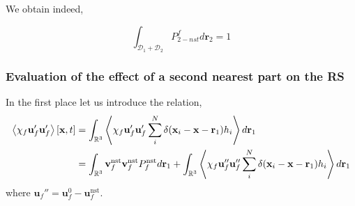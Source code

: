 We obtain indeed, 

\begin{equation}
    \int_{
        \mathcal{D}_1 + \mathcal{D}_2
    }
    P_{2-nst}^f
    d\textbf{r}_2 
    = 
    1
\end{equation}


\subsubsection{Evaluation of the effect of a second nearest part on the RS}

In the first place let us introduce the relation, 
\begin{align*}
    \left<\chi_f \textbf{u}_f'\textbf{u}_f'\right>[\textbf{x},t]
    &= 
    \int_{\mathbb{R}^3}
    \left<\chi_f \textbf{u}_f'\textbf{u}_f' 
    \sum_i^N \delta(\textbf{x}_i - \textbf{x}- \textbf{r}_1)
    h_i
    \right>
    d\textbf{r}_1\\
    &= 
    \int_{\mathbb{R}^3}
    \textbf{v}_f^\text{nst}
    \textbf{v}_f^\text{nst}
    P_f^\text{nst}
    d\textbf{r}_1
    + 
    \int_{\mathbb{R}^3}
    \left<\chi_f \textbf{u}_f''\textbf{u}_f'' 
    \sum_i^N \delta(\textbf{x}_i - \textbf{x}- \textbf{r}_1)
    h_i
    \right>
    d\textbf{r}_1
\end{align*}
where $\textbf{u}_f'' = \textbf{u}_f^0 - \textbf{u}_f^\text{nst}$. 

